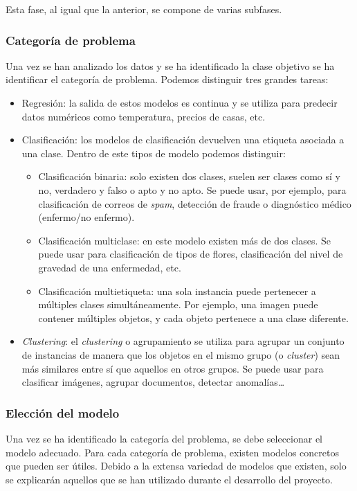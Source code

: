 Esta fase, al igual que la anterior, se compone de varias subfases.

\subsubsection{Categoría de problema}

Una vez se han analizado los datos y se ha identificado la clase objetivo se ha identificar el categoría de problema. Podemos distinguir tres grandes tareas:
\begin{itemize}
\item Regresión: la salida de estos modelos es continua y se utiliza para predecir datos numéricos como temperatura, precios de casas, etc.
\item Clasificación: los modelos de clasificación devuelven una etiqueta asociada a una clase. Dentro de este tipos de modelo podemos distinguir:
\begin{itemize}
\item Clasificación binaria: solo existen dos clases, suelen ser clases como sí y no, verdadero y falso o apto y no apto. Se puede usar, por ejemplo, para clasificación de correos de \textit{spam}, detección de fraude o diagnóstico médico (enfermo/no enfermo).
\item Clasificación multiclase: en este modelo existen más de dos clases. Se puede usar para clasificación de tipos de flores, clasificación del nivel de gravedad de una enfermedad, etc.
\item Clasificación multietiqueta: una sola instancia puede pertenecer a múltiples clases simultáneamente. Por ejemplo, una imagen puede contener múltiples objetos, y cada objeto pertenece a una clase diferente.
\end{itemize}
\item \textit{Clustering}: el \textit{clustering} o agrupamiento se utiliza para agrupar un conjunto de instancias de manera que los objetos en el mismo grupo (o \textit{cluster}) sean más similares entre sí que aquellos en otros grupos. Se puede usar para clasificar imágenes, agrupar documentos, detectar anomalías\ldots 

\end{itemize}

\subsubsection{Elección del modelo}
Una vez se ha identificado la categoría del problema, se debe seleccionar el modelo adecuado. Para cada categoría de problema, existen modelos concretos que pueden ser útiles. Debido a la extensa variedad de modelos que existen, solo se explicarán aquellos que se han utilizado durante el desarrollo del proyecto.

